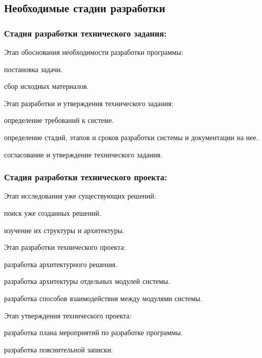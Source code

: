 
\subsection{Необходимые стадии разработки}

\subsubsection{Стадия разработки технического задания:}
\begin{my_enumerate}
\item Этап обоснования необходимости разработки программы:
    \begin{my_enumerate}
    \item постановка задачи.
    \item сбор исходных материалов.
    \end{my_enumerate}
\item Этап разработки и утверждения технического задания:
    \begin{my_enumerate}
    \item определение требований к системе.
    \item определение стадий, этапов и сроков разработки системы и документации на нее.
    \item согласование и утверждение технического задания.
    \end{my_enumerate}
\end{my_enumerate}

\subsubsection{Стадия разработки технического проекта:}
\begin{my_enumerate}
\item Этап исследования уже существующих решений:
    \begin{my_enumerate}
    \item поиск уже созданных решений.
    \item изучение их структуры и архитектуры.
    \end{my_enumerate}
\item Этап разработки технического проекта:
    \begin{my_enumerate}
    \item разработка архитектурного решения.
    \item разработка архитектуры отдельных модулей системы.
    \item разработка способов взаимодействия между модулями системы.
    \end{my_enumerate}
\item Этап утверждения технического проекта:
    \begin{my_enumerate}
    \item разработка плана мероприятий по разработке программы.
    \item разработка пояснительной записки.
    \end{my_enumerate}
\end{my_enumerate}


